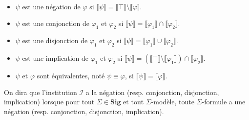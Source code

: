 \documentclass[11pt,a4paper]{article}
\newcommand{\ph}{\varphi}
\newcommand{\gr}{\textbf}
\newcommand{\I}{\mathcal{I}}
\newcommand{\lb}{\llbracket}
\newcommand{\rb}{\rrbracket}
\newcommand{\1}{\mathbbm{1}}
\begin{document}
\begin{itemize}
\setlength\itemsep{-0.3em}
\item $\psi$ est une négation de $\ph$ si $\lb \psi \rb = \lb \top \rb \setminus \lb \ph \rb$.
\item $\psi$ est une conjonction de $\ph_1$ et $\ph_2$ si $\lb \psi \rb = \lb \ph_1 \rb \cap \lb \ph_2 \rb$.
\item $\psi$ est une disjonction de $\ph_1$ et $\ph_2$ si $\lb \psi \rb = \lb \ph_1 \rb \cup \lb \ph_2 \rb$.
\item $\psi$ est une implication de $\ph_1$ et $\ph_2$ si $\lb \psi \rb = (\lb \top \rb \setminus \lb \ph_1 \rb) \cap \lb \ph_2 \rb$.
\item $\psi$ et $\ph$ sont équivalentes, noté $\psi \equiv \ph$, si $\lb \psi \rb = \lb \ph \rb$.
\end{itemize}
On dira que l'institution $\I$ a la négation (resp. conjonction, disjonction, implication) lorsque pour tout $\Sigma \in \gr{Sig}$ et tout $\Sigma$-modèle, toute $\Sigma$-formule a une négation (resp. conjonction, disjonction, implication).
\end{document}

